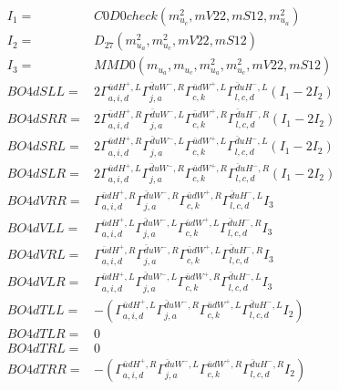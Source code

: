 \documentclass[A4,landscape]{article}
\begin{document}
\begin{align} 
I_1 = & C0D0check(m^2_{u_{{c}}}, mV22, mS12, m^2_{u_{{a}}}) \\ 
I_2 = & D_{27}(m^2_{u_{{a}}}, m^2_{u_{{c}}}, mV22, mS12) \\ 
I_3 = & MMD0(m_{u_{{a}}}, m_{u_{{c}}}, m^2_{u_{{a}}}, m^2_{u_{{c}}}, mV22, mS12) \\ 
  BO4dSLL= & 2  \Gamma^{\bar{u}d H^+,L}_{a, i, d} \Gamma^{\bar{d}u W^- ,R}_{j, a} \Gamma^{\bar{u}d W^+,L}_{c, k} \Gamma^{\bar{d}u H^- ,L}_{l, c, d} (I_1 - 2 I_2) \\ 
  BO4dSRR= & 2  \Gamma^{\bar{u}d H^+,R}_{a, i, d} \Gamma^{\bar{d}u W^- ,L}_{j, a} \Gamma^{\bar{u}d W^+,R}_{c, k} \Gamma^{\bar{d}u H^- ,R}_{l, c, d} (I_1 - 2 I_2) \\ 
  BO4dSRL= & 2  \Gamma^{\bar{u}d H^+,R}_{a, i, d} \Gamma^{\bar{d}u W^- ,L}_{j, a} \Gamma^{\bar{u}d W^+,L}_{c, k} \Gamma^{\bar{d}u H^- ,L}_{l, c, d} (I_1 - 2 I_2) \\ 
  BO4dSLR= & 2  \Gamma^{\bar{u}d H^+,L}_{a, i, d} \Gamma^{\bar{d}u W^- ,R}_{j, a} \Gamma^{\bar{u}d W^+,R}_{c, k} \Gamma^{\bar{d}u H^- ,R}_{l, c, d} (I_1 - 2 I_2) \\ 
  BO4dVRR= &  \Gamma^{\bar{u}d H^+,R}_{a, i, d} \Gamma^{\bar{d}u W^- ,R}_{j, a} \Gamma^{\bar{u}d W^+,R}_{c, k} \Gamma^{\bar{d}u H^- ,L}_{l, c, d} I_3 \\ 
  BO4dVLL= &  \Gamma^{\bar{u}d H^+,L}_{a, i, d} \Gamma^{\bar{d}u W^- ,L}_{j, a} \Gamma^{\bar{u}d W^+,L}_{c, k} \Gamma^{\bar{d}u H^- ,R}_{l, c, d} I_3 \\ 
  BO4dVRL= &  \Gamma^{\bar{u}d H^+,R}_{a, i, d} \Gamma^{\bar{d}u W^- ,R}_{j, a} \Gamma^{\bar{u}d W^+,L}_{c, k} \Gamma^{\bar{d}u H^- ,R}_{l, c, d} I_3 \\ 
  BO4dVLR= &  \Gamma^{\bar{u}d H^+,L}_{a, i, d} \Gamma^{\bar{d}u W^- ,L}_{j, a} \Gamma^{\bar{u}d W^+,R}_{c, k} \Gamma^{\bar{d}u H^- ,L}_{l, c, d} I_3 \\ 
  BO4dTLL= & -( \Gamma^{\bar{u}d H^+,L}_{a, i, d} \Gamma^{\bar{d}u W^- ,R}_{j, a} \Gamma^{\bar{u}d W^+,L}_{c, k} \Gamma^{\bar{d}u H^- ,L}_{l, c, d} I_2) \\ 
  BO4dTLR= & 0 \\ 
  BO4dTRL= & 0 \\ 
  BO4dTRR= & -( \Gamma^{\bar{u}d H^+,R}_{a, i, d} \Gamma^{\bar{d}u W^- ,L}_{j, a} \Gamma^{\bar{u}d W^+,R}_{c, k} \Gamma^{\bar{d}u H^- ,R}_{l, c, d} I_2) \\ 
\end{align} 
\end{document}
